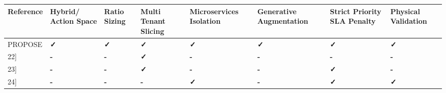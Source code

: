 {\def\LTcaptype{none} %
\begin{longtable}[]{@{}
  >{\centering\arraybackslash}p{}
  >{\raggedright\arraybackslash}p{}
  >{\raggedright\arraybackslash}p{}
  >{\raggedright\arraybackslash}p{}
  >{\raggedright\arraybackslash}p{}
  >{\raggedright\arraybackslash}p{}
  >{\raggedright\arraybackslash}p{}
  >{\raggedright\arraybackslash}p{}@{}}
\toprule\noalign{}
\begin{minipage}[b]{\linewidth}\centering
Reference
\end{minipage} & \begin{minipage}[b]{\linewidth}\centering
Hybrid/ Action Space
\end{minipage} & \begin{minipage}[b]{\linewidth}\centering
Ratio Sizing
\end{minipage} & \begin{minipage}[b]{\linewidth}\centering
Multi Tenant Slicing
\end{minipage} & \begin{minipage}[b]{\linewidth}\centering
Microservices Isolation
\end{minipage} & \begin{minipage}[b]{\linewidth}\centering
Generative Augmentation
\end{minipage} & \begin{minipage}[b]{\linewidth}\centering
Strict Priority SLA Penalty
\end{minipage} & \begin{minipage}[b]{\linewidth}\centering
Physical Validation
\end{minipage} \\
\midrule\noalign{}
\endhead
\bottomrule\noalign{}
\endlastfoot
PROPOSE & \textbf{✓} & \textbf{✓} & \textbf{✓} & \textbf{✓} & \textbf{✓} & \textbf{✓} & \textbf{✓} \\
{[}22{]} & \textbf{-} & \textbf{-} & \textbf{✓} & \textbf{-} & \textbf{-} & \textbf{-} & \textbf{-} \\
{[}23{]} & \textbf{-} & \textbf{-} & \textbf{✓} & \textbf{-} & \textbf{-} & \textbf{✓} & \textbf{-} \\
{[}24{]} & \textbf{-} & \textbf{-} & \textbf{-} & \textbf{✓} & \textbf{-} & \textbf{✓} & \textbf{✓} \\

\end{longtable}}
